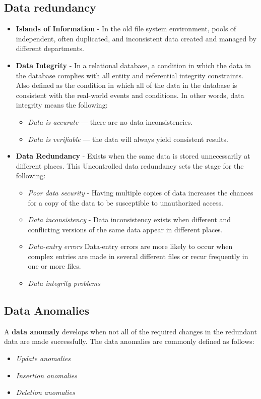 \documentclass[a4paper, 12pt, titlepage]{report}
\begin{document}
\subsection{Data redundancy}
\begin{itemize}
\item \textbf{Islands of Information} - In the old file system environment, pools of independent, often duplicated, and inconsistent data created and managed by different departments.
\item \textbf{Data Integrity} - In a relational database, a condition in which the data in the database complies with all entity and referential integrity constraints. Also defined as the condition in which all of the data in the database is consistent with the real-world events and conditions. In other words, data integrity means the following:
\begin{itemize}
\item \emph{Data is accurate} — there are no data inconsistencies.
\item \emph{Data is verifiable} — the data will always yield consistent results.
\end{itemize}
\item \textbf{Data Redundancy} - Exists when the same data is stored unnecessarily at different places. This Uncontrolled data redundancy sets the stage for the following:
\begin{itemize}
\item \emph{Poor data security} - Having multiple copies of data increases the chances for a copy of
the data to be susceptible to unauthorized access.
\item \emph{Data inconsistency} - Data inconsistency exists when different and conflicting versions of the same data appear in different places.
\item \emph{Data-entry errors} Data-entry errors are more likely to occur when complex entries are made in several different files or recur frequently in one or more files.
\item \emph{Data integrity problems}
\end{itemize}
\end{itemize}

\subsection{Data Anomalies}
A \textbf{data anomaly} develops when not all of the required changes in the redundant data are made successfully. The data anomalies are commonly defined as follows:
\begin{itemize}
\item \emph{Update anomalies}
\item \emph{Insertion anomalies}
\item \emph{Deletion anomalies}
\end{itemize}
\end{document}
